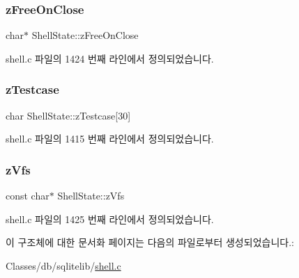 \subsubsection{\texorpdfstring{z\+Free\+On\+Close}{zFreeOnClose}}
{\footnotesize\ttfamily char$\ast$ Shell\+State\+::z\+Free\+On\+Close}



shell.\+c 파일의 1424 번째 라인에서 정의되었습니다.

\mbox{\label{struct_shell_state_a8c9b32aa186f1b581fc57f324cad108e}} 
\subsubsection{\texorpdfstring{z\+Testcase}{zTestcase}}
{\footnotesize\ttfamily char Shell\+State\+::z\+Testcase\mbox{[}30\mbox{]}}



shell.\+c 파일의 1415 번째 라인에서 정의되었습니다.

\mbox{\label{struct_shell_state_a7a17ec105e801f6d466f3dd8e29521e6}} 
\subsubsection{\texorpdfstring{z\+Vfs}{zVfs}}
{\footnotesize\ttfamily const char$\ast$ Shell\+State\+::z\+Vfs}



shell.\+c 파일의 1425 번째 라인에서 정의되었습니다.



이 구조체에 대한 문서화 페이지는 다음의 파일로부터 생성되었습니다.\+:\begin{DoxyCompactItemize}
\item 
Classes/db/sqlitelib/\hyperlink{shell_8c}{shell.\+c}\end{DoxyCompactItemize}
